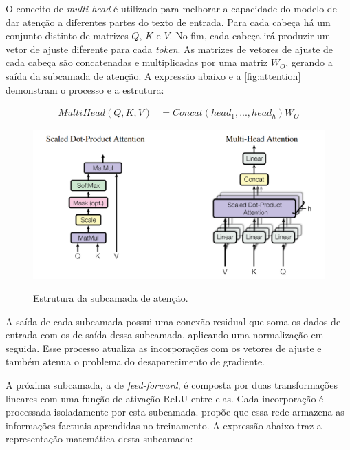 O conceito de \textit{multi-head} é utilizado para melhorar a capacidade do modelo de dar atenção a diferentes partes do texto de entrada. Para cada cabeça há um
conjunto distinto de matrizes \begin{math}Q\end{math}, \begin{math}K\end{math} e \begin{math}V\end{math}. No fim, cada cabeça irá produzir um vetor de ajuste diferente
para cada \textit{token}. As matrizes de vetores de ajuste de cada cabeça são concatenadas e multiplicadas por uma matriz \begin{math}W_O\end{math}, gerando a saída da
subcamada de atenção. A expressão abaixo e a \autoref{fig:attention} demonstram o processo e a estrutura:

\begin{align*}
      MultiHead(Q, K, V) & = Concat(head_1,...,head_h)W_O
\end{align*}

\begin{figure}[ht]
      \centering
      \caption{\small Estrutura da subcamada de atenção.}
      \includegraphics[width=0.7\columnwidth,keepaspectratio]{images/attention.png}
      \label{fig:attention}
\end{figure}

A saída de cada subcamada possui uma conexão residual que soma os dados de entrada com os de saída dessa subcamada, aplicando uma normalização em seguida. Esse processo
atualiza as incorporações com os vetores de ajuste e também atenua o problema do desaparecimento de gradiente.

A próxima subcamada, a de \textit{feed-forward}, é composta por duas transformações lineares com uma função de ativação \ac{ReLU} entre elas. Cada incorporação é
processada isoladamente por esta subcamada. \textcite{feed_forward_knowledge} propõe que essa rede armazena as informações factuais aprendidas no treinamento. A
expressão abaixo traz a representação matemática desta subcamada:

